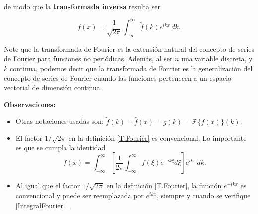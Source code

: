 de modo que la \textbf{transformada inversa} resulta ser
\begin{shaded}
  \begin{equation}
 f(x) = \frac{1}{\sqrt{2\pi}} \int_{-\infty}^{\infty} \tilde{f}(k) e^{ikx} \,dk. \label{I.Fourier}
\end{equation}  
\end{shaded}

 Note que la transformada de Fourier es la extensión natural del concepto de series de Fourier para funciones no periódicas. Además, al ser $n$ una variable discreta, y $k$ continua, podemos decir que la transformada de Fourier es la generalización del concepto de series de Fourier cuando las funciones pertenecen a un espacio vectorial de dimensión continua.

\textbf{Observaciones:}
\begin{itemize}
    \item Otras notaciones usadas son: $\tilde{f}(k) = \hat{f}(x) = g(k) = \mathcal{F}\{f(x)\}(k)$.
    
    \item El factor $1/\sqrt{2\pi}$ en la definición \eqref{T.Fourier} es convencional. Lo importante es que se cumpla la identidad
    \begin{equation}
        f(x) = \int_{-\infty}^{\infty} \left[\frac{1}{2\pi} \int_{-\infty}^{\infty} f(\xi) e^{-ik\xi} d\xi \right] e^{ikx} \,dk.
      \label{IntegralFourier}
    \end{equation}
   

    \item Al igual que el factor $1/\sqrt{2\pi}$ en la definición \eqref{T.Fourier}, la función $e^{-ikx}$ es convencional y puede ser reemplazada por $e^{ikx}$, siempre y cuando se verifique \eqref{IntegralFourier} \cite{Butkov, Riley}.
    


\end{itemize}
